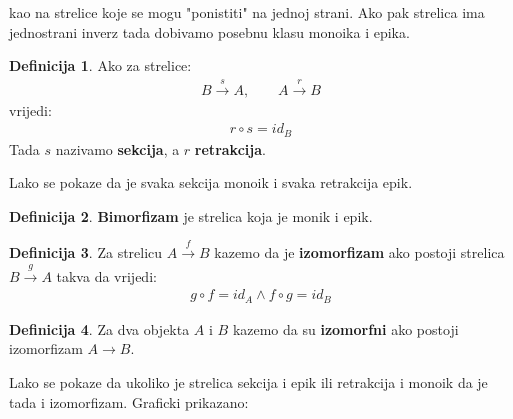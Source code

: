\documentclass[11pt]{article}
\theoremstyle{definition}
\newtheorem{definition}{Definicija}
\begin{document}
    kao na strelice koje se mogu "ponistiti" na jednoj strani. Ako pak strelica
    ima jednostrani inverz tada dobivamo posebnu klasu monoika i epika.
    \begin{definition}
      Ako za strelice:
      \begin{align*}
        B \xrightarrow{s} A, \qquad A \xrightarrow{r} B
      \end{align*}
      vrijedi:
      \begin{align*}
        r \circ s = id_B
      \end{align*}
      Tada $s$ nazivamo \textbf{sekcija}, a $r$ \textbf{retrakcija}.
    \end{definition}
    Lako se pokaze da je svaka sekcija monoik i svaka retrakcija epik.
    \begin{definition}
      \textbf{Bimorfizam} je strelica koja je monik i epik.
    \end{definition}
    \begin{definition}
      Za strelicu $A \xrightarrow{f} B$ kazemo da je \textbf{izomorfizam} ako
      postoji strelica $B \xrightarrow{g} A$ takva da vrijedi:
      \begin{align}
        g \circ f = id_A \wedge f \circ g = id_B
      \end{align}
    \end{definition}
    \begin{definition}
      Za dva objekta $A$ i $B$ kazemo da su \textbf{izomorfni} ako postoji izomorfizam
      $A \xrightarrow{} B$.
    \end{definition}

    Lako se pokaze da ukoliko je strelica sekcija i epik ili retrakcija i
    monoik da je tada i izomorfizam.
    Graficki prikazano:
    \begin{center}
    \end{center}
  \newpage
\end{document}
